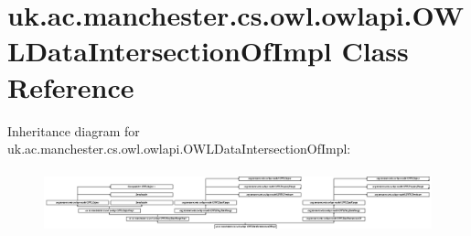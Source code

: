 \hypertarget{classuk_1_1ac_1_1manchester_1_1cs_1_1owl_1_1owlapi_1_1_o_w_l_data_intersection_of_impl}{\section{uk.\-ac.\-manchester.\-cs.\-owl.\-owlapi.\-O\-W\-L\-Data\-Intersection\-Of\-Impl Class Reference}
\label{classuk_1_1ac_1_1manchester_1_1cs_1_1owl_1_1owlapi_1_1_o_w_l_data_intersection_of_impl}
}
Inheritance diagram for uk.\-ac.\-manchester.\-cs.\-owl.\-owlapi.\-O\-W\-L\-Data\-Intersection\-Of\-Impl\-:\begin{figure}[H]
\begin{center}
\leavevmode
\includegraphics[height=1.819870cm]{classuk_1_1ac_1_1manchester_1_1cs_1_1owl_1_1owlapi_1_1_o_w_l_data_intersection_of_impl}
\end{center}
\end{figure}
